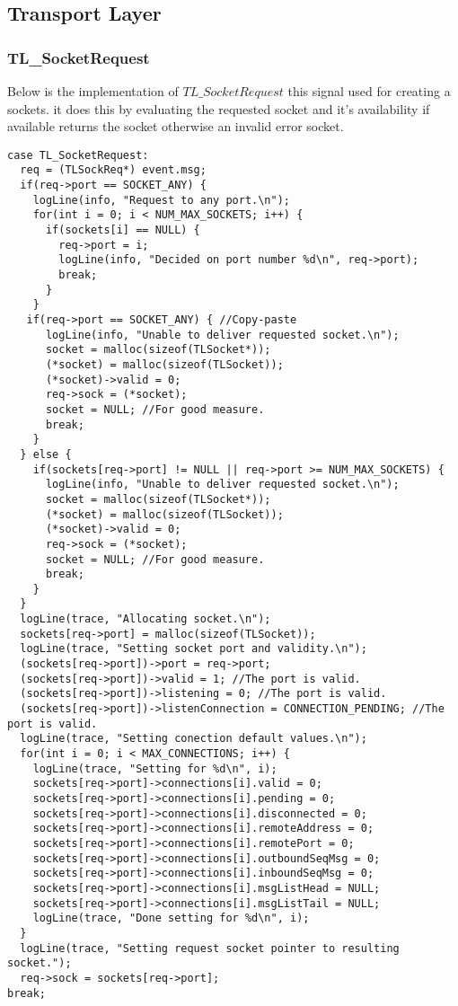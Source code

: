 \subsection{Transport Layer}
\subsubsection{TL\_SocketRequest}
Below is the implementation of $TL\_SocketRequest$ this signal used for creating a sockets.
it does this by evaluating the requested socket and it's availability if available returns the socket otherwise an invalid error socket.
\begin{lstlisting}
case TL_SocketRequest:
  req = (TLSockReq*) event.msg;
  if(req->port == SOCKET_ANY) {
    logLine(info, "Request to any port.\n");
    for(int i = 0; i < NUM_MAX_SOCKETS; i++) {
      if(sockets[i] == NULL) {
        req->port = i;
        logLine(info, "Decided on port number %d\n", req->port);
        break;
      }
    }
   if(req->port == SOCKET_ANY) { //Copy-paste
      logLine(info, "Unable to deliver requested socket.\n");
      socket = malloc(sizeof(TLSocket*));
      (*socket) = malloc(sizeof(TLSocket));
      (*socket)->valid = 0;
      req->sock = (*socket);
      socket = NULL; //For good measure.
      break;
    }
  } else {
    if(sockets[req->port] != NULL || req->port >= NUM_MAX_SOCKETS) {
      logLine(info, "Unable to deliver requested socket.\n");
      socket = malloc(sizeof(TLSocket*));
      (*socket) = malloc(sizeof(TLSocket));
      (*socket)->valid = 0;
      req->sock = (*socket);
      socket = NULL; //For good measure.
      break;
    }
  }
  logLine(trace, "Allocating socket.\n");
  sockets[req->port] = malloc(sizeof(TLSocket));
  logLine(trace, "Setting socket port and validity.\n");
  (sockets[req->port])->port = req->port;
  (sockets[req->port])->valid = 1; //The port is valid.
  (sockets[req->port])->listening = 0; //The port is valid.
  (sockets[req->port])->listenConnection = CONNECTION_PENDING; //The port is valid.
  logLine(trace, "Setting conection default values.\n");
  for(int i = 0; i < MAX_CONNECTIONS; i++) {
    logLine(trace, "Setting for %d\n", i);
    sockets[req->port]->connections[i].valid = 0;
    sockets[req->port]->connections[i].pending = 0;
    sockets[req->port]->connections[i].disconnected = 0;
    sockets[req->port]->connections[i].remoteAddress = 0;
    sockets[req->port]->connections[i].remotePort = 0;
    sockets[req->port]->connections[i].outboundSeqMsg = 0;
    sockets[req->port]->connections[i].inboundSeqMsg = 0;
    sockets[req->port]->connections[i].msgListHead = NULL;
    sockets[req->port]->connections[i].msgListTail = NULL;
    logLine(trace, "Done setting for %d\n", i);
  }
  logLine(trace, "Setting request socket pointer to resulting socket.");
  req->sock = sockets[req->port];
break;
\end{lstlisting}

